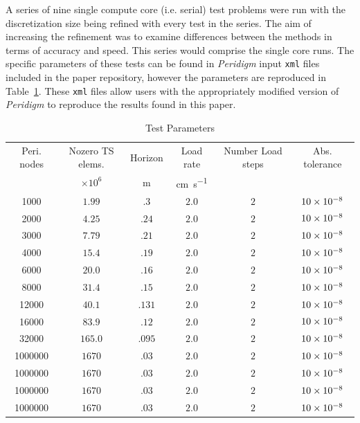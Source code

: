 \documentclass[preprint,12pt]{elsarticle}
\begin{document}
A series of nine single compute core (i.e. serial) test problems were run with
the discretization size being refined with every test in the series. The aim of
increasing the refinement was to examine differences between the methods in
terms of accuracy and speed. This series would comprise the single core runs. 
The specific parameters of these tests can be found in \emph{Peridigm} input
{\tt xml} files included in the paper repository, however the parameters
are reproduced in Table~\ref{tab:TestParams}. These {\tt xml} files allow
users with the appropriately modified version of \emph{Peridigm} to reproduce
the results found in this paper.

\begin{table}[!ht]    
  \scriptsize
  \centering
        \caption{Test Parameters} \label{tab:TestParams}   
       \begin{tabular}{c c c c c c}
         \toprule
         Peri. nodes & Nozero TS elems. & Horizon & Load rate & Number Load steps & Abs. tolerance \\ 
                     & $\times 10^6$    & \si{\meter}& \si{\centi\meter\per\second} &   &     \\
        \midrule
        1000 & $1.99$             & $.3$   & $2.0$ & $2$ & $\num{10E-8}$ \\
        2000 & $4.25$             & $.24$  & $2.0$ & $2$ & $\num{10E-8}$ \\
        3000 & $7.79$             & $.21$  & $2.0$ & $2$ & $\num{10E-8}$ \\
        4000 & $15.4$             & $.19$  & $2.0$ & $2$ & $\num{10E-8}$ \\
        6000 & $20.0$             & $.16$  & $2.0$ & $2$ & $\num{10E-8}$ \\
        8000 & $31.4$             & $.15$  & $2.0$ & $2$ & $\num{10E-8}$ \\
        12000 & $40.1$            & $.131$ & $2.0$ & $2$ & $\num{10E-8}$ \\
        16000 & $83.9$            & $.12$  & $2.0$ & $2$ & $\num{10E-8}$ \\
        32000 & $165.0$           & $.095$ & $2.0$ & $2$ & $\num{10E-8}$ \\
        1000000 & $1670$          & $.03$  & $2.0$ & $2$ & $\num{10E-8}$ \\
        1000000 & $1670$          & $.03$  & $2.0$ & $2$ & $\num{10E-8}$ \\
        1000000 & $1670$          & $.03$  & $2.0$ & $2$ & $\num{10E-8}$ \\
        1000000 & $1670$          & $.03$  & $2.0$ & $2$ & $\num{10E-8}$ \\
        \bottomrule
    \end{tabular}
\end{table}
\end{document}
